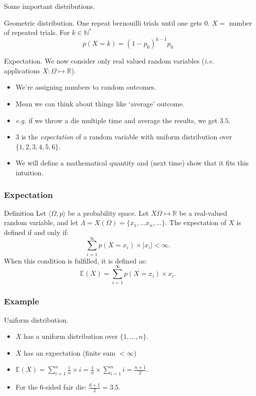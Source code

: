 \documentclass{beamer}
\begin{document}
\begin{frame}{Some important distributions.}
  \begin{exampleblock}{Geometric distribution.}
    One repeat bernouilli trials until one gets $0$. $X = $ number of repeated trials. For $k \in \mathbb{N}^*$
    \[p(X = k) = (1 - p_0)^{k-1}p_0\]
    
  \end{exampleblock}
\end{frame}

\begin{frame}{Expectation.}
  We now consider only real valued random variables (\emph{i.e.} applications $X: \Omega \mapsto \mathbb{R}$).

  \begin{itemize}
  \item We're assigning numbers to random outcomes.
  \item Mean we can think about things like `average' outcome.
  \item \emph{e.g.} if we throw a die multiple time and average the results, we get $3.5$.
  \item $3$ is the \emph{expectation} of a random variable with uniform distribution over $\{1,2,3,4,5,6\}$.
  \item We will define a mathematical quantity and (next time) show that it fits this intuition.
  \end{itemize}
\end{frame}

\begin{frame}
  \frametitle{Expectation}
  \begin{block}{Definition}
    Let $\langle \Omega, p \rangle$ be a probability space. Let $X \Omega \mapsto \mathbb{R}$ be a real-valued random variable, and let $\Lambda = X(\Omega) = \{x_1, \dots x_n, \dots\}$. The expectation of $X$ is defined if and only if:
    \[\sum^{\infty}_{i=1} p(X = x_i) \times |x_i| < \infty.\]
    When this condition is fulfilled, it is defined as:
    \[\mathbb{E}(X) = \sum^{\infty}_{i=1} p(X = x_i) \times x_i.\]
  \end{block}
\end{frame}

\begin{frame}
  \frametitle{Example}
  \begin{exampleblock}{Uniform distribution.}
    \begin{itemize}
    \item $X$ has a uniform distribution over $\{1, \dots, n\}$.
    \item $X$ has an expectation (finite sum $< \infty$)
    \item $\mathbb{E}(X) = \sum^n_{i=1} \frac{1}{n} \times i = \frac{1}{n} \times \sum^n_{i = 1} i = \frac{n+1}{2}$.     
    \item For the $6$-sided fair die: $\frac{6+1}{2} = 3.5$.
    \end{itemize}
  \end{exampleblock}
\end{frame}
\end{document}
